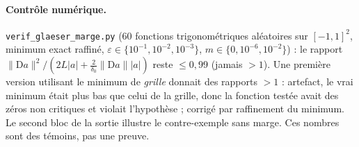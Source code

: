 \documentclass[11pt,a4paper]{article}
\theoremstyle{remark}
\newcommand{\D}{\mathrm D}
\begin{document}
\paragraph{Contrôle numérique.} \texttt{verif\_glaeser\_marge.py} (60 fonctions trigonométriques aléatoires sur $[-1,1]^2$, minimum exact raffiné, $\varepsilon\in\{10^{-1},10^{-2},10^{-3}\}$, $m\in\{0,10^{-6},10^{-2}\}$) : le rapport $\lVert\D a\rVert^2/(2L\lvert a\rvert+\frac2{\delta_0}\lVert\D a\rVert\lvert a\rvert)$ reste $\le0{,}99$ (jamais $>1$). Une première version utilisant le minimum de \emph{grille} donnait des rapports $>1$ : artefact, le vrai minimum était plus bas que celui de la grille, donc la fonction testée avait des zéros non critiques et violait l'hypothèse ; corrigé par raffinement du minimum. Le second bloc de la sortie illustre le contre-exemple sans marge. Ces nombres sont des témoins, pas une preuve.
\end{document}
